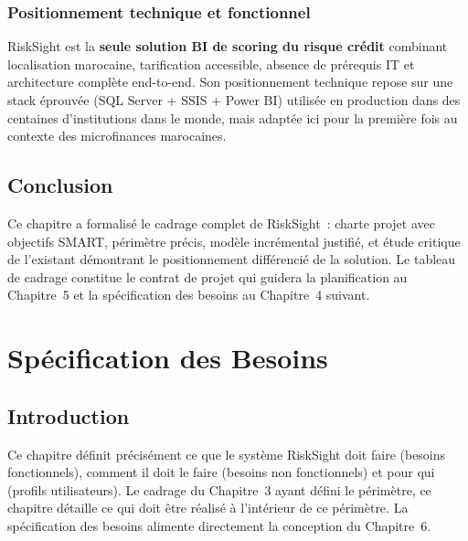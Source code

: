 \documentclass[12pt, a4paper]{report}
\begin{document}
\subsection{Positionnement technique et fonctionnel}

RiskSight est la \textbf{seule solution BI de scoring du risque crédit} combinant
localisation marocaine, tarification accessible, absence de prérequis IT et
architecture complète end-to-end. Son positionnement technique repose sur une
stack éprouvée (SQL Server + SSIS + Power BI) utilisée en production dans des
centaines d'institutions dans le monde, mais adaptée ici pour la première fois
au contexte des microfinances marocaines.

\section{Conclusion}

Ce chapitre a formalisé le cadrage complet de RiskSight~: charte projet avec
objectifs SMART, périmètre précis, modèle incrémental justifié, et étude critique
de l'existant démontrant le positionnement différencié de la solution. Le tableau
de cadrage constitue le contrat de projet qui guidera la planification au
Chapitre~5 et la spécification des besoins au Chapitre~4 suivant.

\chapter{Spécification des Besoins}
\vspace{1cm}
\section{Introduction}

Ce chapitre définit précisément ce que le système RiskSight doit faire (besoins
fonctionnels), comment il doit le faire (besoins non fonctionnels) et pour qui
(profils utilisateurs). Le cadrage du Chapitre~3 ayant défini le périmètre, ce
chapitre détaille ce qui doit être réalisé à l'intérieur de ce périmètre. La
spécification des besoins alimente directement la conception du Chapitre~6.
\vspace{1cm}
\end{document}
